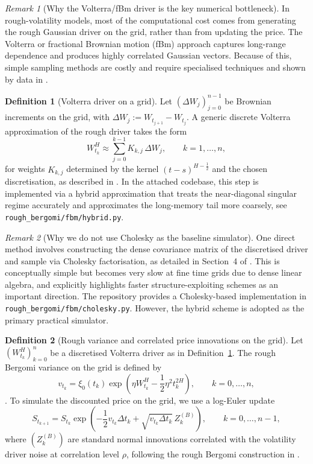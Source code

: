 \documentclass[12pt,a4paper]{article}
\theoremstyle{definition}
\newtheorem{definition}{Definition}[section]
\theoremstyle{plain}
\theoremstyle{remark}
\newtheorem{remark}{Remark}[section]
\theoremstyle{plain}
\begin{document}
\begin{remark}[Why the Volterra/fBm driver is the key numerical bottleneck]
\label{rem:rb_driver_bottleneck}
In rough-volatility models, most of the computational cost comes from generating the rough Gaussian driver on the grid, rather than from updating the price.
The Volterra or fractional Brownian motion (fBm) approach captures long-range dependence and produces highly correlated Gaussian vectors. Because of this, simple sampling methods are costly and require specialised techniques \cite{BayerFriz2016} and shown by data in \cite{GatheralRough}.
\end{remark}

\begin{definition}[Volterra driver on a grid]
\label{def:rb_volterra_grid}
Let $(\Delta W_j)_{j=0}^{n-1}$ be Brownian increments on the grid, with $\Delta W_j:=W_{t_{j+1}}-W_{t_j}$.
A generic discrete Volterra approximation of the rough driver takes the form
\[
W^H_{t_k}\approx \sum_{j=0}^{k-1} K_{k,j}\,\Delta W_j,
\qquad k=1,\dots,n,
\]
for weights $K_{k,j}$ determined by the kernel $(t-s)^{H-\frac12}$ and the chosen discretisation, as described in \cite{BayerFriz2016}.
In the attached codebase, this step is implemented via a hybrid approximation that treats the near-diagonal singular regime accurately and approximates the long-memory tail more coarsely, see \texttt{rough\_bergomi/fbm/hybrid.py}.
\end{definition}

\begin{remark}[Why we do not use Cholesky as the baseline simulator]
\label{rem:rb_no_cholesky}
One direct method involves constructing the dense covariance matrix of the discretised driver and sample via Cholesky factorisation, as detailed in Section~4 of \cite{BayerFriz2016}.
This is conceptually simple but becomes very slow at fine time grids due to dense linear algebra, and \cite{BayerFriz2016} explicitly highlights faster structure-exploiting schemes as an important direction.
The repository provides a Cholesky-based implementation in \texttt{rough\_bergomi/fbm/cholesky.py}. However, the hybrid scheme is adopted as the primary practical simulator.
\end{remark}

\begin{definition}[Rough variance and correlated price innovations on the grid]
\label{def:rb_variance_price_grid}
Let $(W^H_{t_k})_{k=0}^n$ be a discretised Volterra driver as in Definition~\ref{def:rb_volterra_grid}.
The rough Bergomi variance on the grid is defined by
\[
v_{t_k}
=
\xi_0(t_k)\exp\!\left(\eta W^H_{t_k}-\frac12\eta^2 t_k^{2H}\right),
\qquad k=0,\dots,n,
\]
\cite{BayerFriz2016}.
To simulate the discounted price on the grid, we use a log-Euler update
\[
S_{t_{k+1}}
=
S_{t_k}\exp\!\left(-\frac12 v_{t_k}\Delta t_k+\sqrt{v_{t_k}\Delta t_k}\,Z_k^{(B)}\right),
\qquad k=0,\dots,n-1,
\]
where $(Z_k^{(B)})$ are standard normal innovations correlated with the volatility driver noise at correlation level $\rho$, following the rough Bergomi construction in \cite{BayerFriz2016}.
\end{definition}
\end{document}
